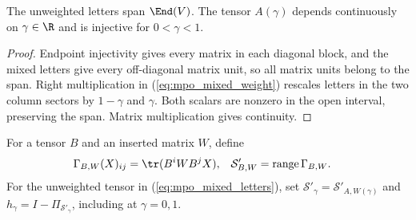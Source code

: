 \begin{lemma}
    \label{thm:mpo_mixed_interior}
    \leanok
    The unweighted letters span $\End(V)$. The tensor $A(\gamma)$ depends
    continuously on $\gamma\in\R$ and is injective for $0<\gamma<1$.
\end{lemma}
\begin{proof}
    \leanok
    Endpoint injectivity gives every matrix in each diagonal block, and
    the mixed letters give every off-diagonal matrix unit, so all matrix
    units belong to the span. Right multiplication in
    (\ref{eq:mpo_mixed_weight}) rescales letters in the two column sectors
    by $1-\gamma$ and $\gamma$. Both scalars are nonzero in the open
    interval, preserving the span. Matrix multiplication gives continuity.
\end{proof}

\begin{definition}
    \label{def:mpo_mixed_extended_support}
    \leanok
    For a tensor $B$ and an inserted matrix $W$, define
    \begin{align}
        \Gamma_{B,W}(X)_{ij} & =\tr(B^iWB^jX),
                             & \mathcal S'_{B,W} & =\operatorname{range}\Gamma_{B,W}.
        \label{eq:mpo_inserted_boundary}
    \end{align}
    For the unweighted tensor in (\ref{eq:mpo_mixed_letters}), set
    $\mathcal S'_\gamma=\mathcal S'_{A,W(\gamma)}$ and
    $h_\gamma=I-\Pi_{\mathcal S'_\gamma}$, including at $\gamma=0,1$.
\end{definition}

